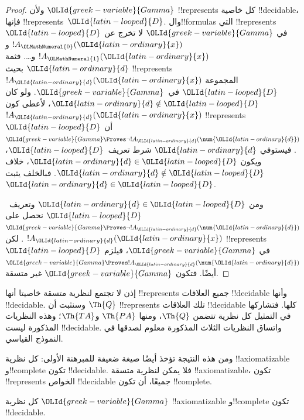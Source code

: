 \documentclass[../../../include/open-logic-section]{subfiles}
\begin{document}
\begin{proof}
ولأن ${\OLId{greek-variable}{Gamma}}$ !!{represents} كل خاصية
!!{decidable}، فإنها !!{represents}~${\OLId{latin-looped}{D}}$.
وال!!{formula}s التي !!{represents}~${\OLId{latin-looped}{D}}$
في ${\OLId{greek-variable}{Gamma}}$ لا تخرج عن $!A_{\OLMathNumeral{0}}({\OLId{latin-ordinary}{x}})$ و$!A_{\OLMathNumeral{1}}({\OLId{latin-ordinary}{x}})$
و\dots. فثمة ${\OLId{latin-ordinary}{d}}$ بحيث !!{represents}
$!A_{\OLId{latin-ordinary}{d}}({\OLId{latin-ordinary}{x}})$ المجموعة ${\OLId{latin-looped}{D}}$ في~${\OLId{greek-variable}{Gamma}}$.
ولو كان ${\OLId{latin-ordinary}{d}}\notin {\OLId{latin-looped}{D}}$، لأعطى كون $!A_{\OLId{latin-ordinary}{d}}({\OLId{latin-ordinary}{x}})$
!!{represents}~${\OLId{latin-looped}{D}}$ أن
${\OLId{greek-variable}{Gamma}}\Proves\lnot !A_{\OLId{latin-ordinary}{d}}(\num{{\OLId{latin-ordinary}{d}}})$.
فيستوفي ${\OLId{latin-ordinary}{d}}$ شرط تعريف~${\OLId{latin-looped}{D}}$، ويكون ${\OLId{latin-ordinary}{d}}\in {\OLId{latin-looped}{D}}$،
خلاف ${\OLId{latin-ordinary}{d}}\notin {\OLId{latin-looped}{D}}$. فبالخلف يثبت ${\OLId{latin-ordinary}{d}}\in {\OLId{latin-looped}{D}}$.

ومن ${\OLId{latin-ordinary}{d}}\in {\OLId{latin-looped}{D}}$ وتعريف~${\OLId{latin-looped}{D}}$ نحصل على
${\OLId{greek-variable}{Gamma}}\Proves\lnot !A_{\OLId{latin-ordinary}{d}}(\num{{\OLId{latin-ordinary}{d}}})$.
لكن $!A_{\OLId{latin-ordinary}{d}}({\OLId{latin-ordinary}{x}})$ !!{represents}~${\OLId{latin-looped}{D}}$ في ${\OLId{greek-variable}{Gamma}}$،
فيلزم ${\OLId{greek-variable}{Gamma}}\Proves !A_{\OLId{latin-ordinary}{d}}(\num{{\OLId{latin-ordinary}{d}}})$ أيضًا.
فتكون ${\OLId{greek-variable}{Gamma}}$ غير متسقة.
\end{proof}

\begin{explain}
إذن لا تجتمع لنظرية متسقة خاصيتا أنها
!!{represents} جميع العلاقات !!{decidable}
وأنها !!{decidable}. وسنثبت أن $\Th{Q}$
!!{represents} تلك العلاقات !!{decidable} كلها.
فتشاركها في التمثيل كل نظرية تتضمن $\Th{Q}$،
ومنها $\Th{PA}$ و$\Th{TA}$؛ وهذه النظريات
المذكورة ليست !!{decidable}. واتساق النظريات
الثلاث المذكورة معلوم لصدقها في النموذج القياسي.

ومن هذه النتيجة تؤخذ أيضًا صيغة ضعيفة للمبرهنة
الأولى: كل نظرية !!{axiomatizable} و!!{complete}
تكون !!{decidable}. فلا يمكن لنظرية متسقة
!!{axiomatizable}، تكون !!{represents}
الخواص !!{decidable} جميعًا، أن تكون
!!{complete}.
\end{explain}

\begin{thm}
كل نظرية ${\OLId{greek-variable}{Gamma}}$ !!{axiomatizable}
و!!{complete} تكون !!{decidable}.
\end{thm}
\end{document}
